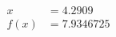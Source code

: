 \documentclass[preview]{standalone}
\begin{document}
\begin{align*}
x &= 4.2909\\f(x) &= 7.9346725
\end{align*}
\end{document}
